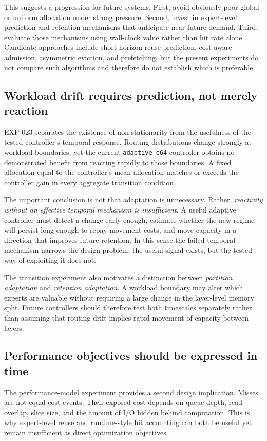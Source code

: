 This suggests a progression for future systems. First, avoid obviously poor global or uniform allocation under strong pressure. Second, invest in expert-level prediction and retention mechanisms that anticipate near-future demand. Third, evaluate those mechanisms using wall-clock value rather than hit rate alone. Candidate approaches include short-horizon reuse prediction, cost-aware admission, asymmetric eviction, and prefetching, but the present experiments do not compare such algorithms and therefore do not establish which is preferable.

\subsection{Workload drift requires prediction, not merely reaction}

EXP-023 separates the existence of non-stationarity from the usefulness of the tested controller's temporal response. Routing distributions change strongly at workload boundaries, yet the current \texttt{adaptive-e64} controller obtains no demonstrated benefit from reacting rapidly to those boundaries. A fixed allocation equal to the controller's mean allocation matches or exceeds the controller gain in every aggregate transition condition.

The important conclusion is not that adaptation is unnecessary. Rather, \emph{reactivity without an effective temporal mechanism is insufficient}. A useful adaptive controller must detect a change early enough, estimate whether the new regime will persist long enough to repay movement costs, and move capacity in a direction that improves future retention. In this sense the failed temporal mechanism narrows the design problem: the useful signal exists, but the tested way of exploiting it does not.

The transition experiment also motivates a distinction between \emph{partition adaptation} and \emph{retention adaptation}. A workload boundary may alter which experts are valuable without requiring a large change in the layer-level memory split. Future controllers should therefore test both timescales separately rather than assuming that routing drift implies rapid movement of capacity between layers.

\subsection{Performance objectives should be expressed in time}

The performance-model experiment provides a second design implication. Misses are not equal-cost events. Their exposed cost depends on queue depth, read overlap, slice size, and the amount of I/O hidden behind computation. This is why expert-level reuse and runtime-style hit accounting can both be useful yet remain insufficient as direct optimization objectives.


